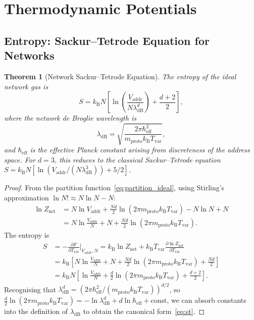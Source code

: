\documentclass[11pt,twocolumn,a4paper]{article}
\newtheorem{theorem}{Theorem}[section]
\theoremstyle{definition}
\theoremstyle{remark}
\newcommand{\kB}{k_{\mathrm{B}}}
\newcommand{\Tvar}{T_{\mathrm{var}}}
\newcommand{\Vaddr}{V_{\mathrm{addr}}}
\newcommand{\mpr}{m_{\mathrm{proto}}}
\newcommand{\Znet}{Z_{\mathrm{net}}}
\newcommand{\dB}{\lambda_{\mathrm{dB}}}
\newcommand{\pder}[2]{\frac{\partial #1}{\partial #2}}
\begin{document}
\section{Thermodynamic Potentials}\label{sec:potentials}

\subsection{Entropy: Sackur--Tetrode Equation for Networks}\label{sec:st}

\begin{theorem}[Network Sackur--Tetrode Equation]\label{thm:st}
The entropy of the ideal network gas is
\begin{equation}\label{eq:st}
  S = \kB N\left[\ln\!\left(\frac{\Vaddr}{N\dB^d}\right)+\frac{d+2}{2}\right],
\end{equation}
where the network de Broglie wavelength is
\begin{equation}\label{eq:debroglie}
  \dB = \sqrt{\frac{2\pi\hbar_{\mathrm{eff}}^2}{\mpr\kB\Tvar}},
\end{equation}
and $\hbar_{\mathrm{eff}}$ is the effective Planck constant arising from
discreteness of the address space.  For $d=3$, this reduces to the classical
Sackur--Tetrode equation $S=\kB N[\ln(\Vaddr/(N\dB^3))+5/2]$.
\end{theorem}

\begin{proof}
From the partition function~\eqref{eq:partition_ideal}, using Stirling's
approximation $\ln N!\approx N\ln N-N$:
\begin{align}
  \ln\Znet &= N\ln\Vaddr + \frac{Nd}{2}\ln(2\pi\mpr\kB\Tvar)
  - N\ln N + N \nonumber\\
  &= N\ln\frac{\Vaddr}{N}+N+\frac{Nd}{2}\ln(2\pi\mpr\kB\Tvar).
  \label{eq:lnZ}
\end{align}
The entropy is
\begin{align}
  S &= -\pder{F}{\Tvar}\bigg|_{\Vaddr,N}
  = \kB\ln\Znet+\kB\Tvar\pder{\ln\Znet}{\Tvar} \nonumber\\
  &= \kB\left[N\ln\frac{\Vaddr}{N}+N+\frac{Nd}{2}\ln(2\pi\mpr\kB\Tvar)
     +\frac{Nd}{2}\right] \nonumber\\
  &= \kB N\left[\ln\frac{\Vaddr}{N}+\frac{d}{2}\ln(2\pi\mpr\kB\Tvar)
     +\frac{d+2}{2}\right]. \label{eq:S_deriv}
\end{align}
Recognising that $\dB^d=(2\pi\hbar_{\mathrm{eff}}^2/(\mpr\kB\Tvar))^{d/2}$,
so $\frac{d}{2}\ln(2\pi\mpr\kB\Tvar)=-\ln\dB^d+d\ln\hbar_{\mathrm{eff}}+
\text{const}$, we can absorb constants into the definition of $\dB$ to
obtain the canonical form~\eqref{eq:st}.
\end{proof}
\end{document}
